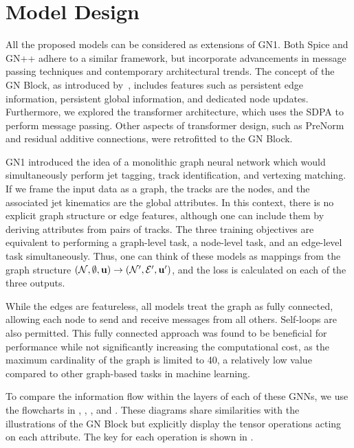 \section{Model Design}

All the proposed models can be considered as extensions of GN1.
Both Spice and GN++ adhere to a similar framework, but incorporate advancements in message passing techniques and contemporary architectural trends.
The concept of the GN Block, as introduced by~\textcite{RelationalInductiveBiases}, includes features such as persistent edge information, persistent global information, and dedicated node updates.
Furthermore, we explored the transformer architecture, which uses the SDPA to perform message passing.
Other aspects of transformer design, such as PreNorm and residual additive connections, were retrofitted to the GN Block.

GN1 introduced the idea of a monolithic graph neural network which would simultaneously perform jet tagging, track identification, and vertexing matching.
If we frame the input data as a graph, the tracks are the nodes, and the associated jet kinematics are the global attributes.
In this context, there is no explicit graph structure or edge features, although one can include them by deriving attributes from pairs of tracks.
The three training objectives are equivalent to performing a graph-level task, a node-level task, and an edge-level task simultaneously.
Thus, one can think of these models as mappings from the graph structure $(\mathcal{N}, \emptyset, \mathbf{u}) \rightarrow (\mathcal{N}', \mathcal{E}', \mathbf{u}')$, and the loss is calculated on each of the three outputs.

While the edges are featureless, all models treat the graph as fully connected, allowing each node to send and receive messages from all others.
Self-loops are also permitted.
This fully connected approach was found to be beneficial for performance while not significantly increasing the computational cost, as the maximum cardinality of the graph is limited to 40, a relatively low value compared to other graph-based tasks in machine learning.

To compare the information flow within the layers of each of these GNNs, we use the flowcharts in , , , and .
These diagrams share similarities with the illustrations of the GN Block  but explicitly display the tensor operations acting on each attribute.
The key for each operation is shown in .

